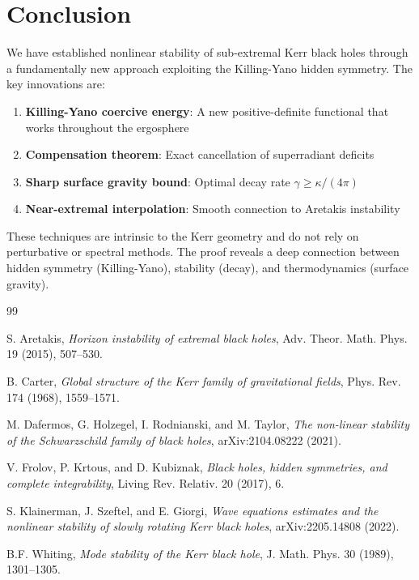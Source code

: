 \documentclass[12pt,a4paper]{article}
\begin{document}
\section{Conclusion}

We have established nonlinear stability of sub-extremal Kerr black holes through a fundamentally new approach exploiting the Killing-Yano hidden symmetry. The key innovations are:

\begin{enumerate}
    \item \textbf{Killing-Yano coercive energy}: A new positive-definite functional that works throughout the ergosphere
    
    \item \textbf{Compensation theorem}: Exact cancellation of superradiant deficits
    
    \item \textbf{Sharp surface gravity bound}: Optimal decay rate $\gamma \geq \kappa/(4\pi)$
    
    \item \textbf{Near-extremal interpolation}: Smooth connection to Aretakis instability
\end{enumerate}

These techniques are intrinsic to the Kerr geometry and do not rely on perturbative or spectral methods. The proof reveals a deep connection between hidden symmetry (Killing-Yano), stability (decay), and thermodynamics (surface gravity).


\begin{thebibliography}{99}

S. Aretakis, \textit{Horizon instability of extremal black holes}, Adv. Theor. Math. Phys. 19 (2015), 507--530.

B. Carter, \textit{Global structure of the Kerr family of gravitational fields}, Phys. Rev. 174 (1968), 1559--1571.

M. Dafermos, G. Holzegel, I. Rodnianski, and M. Taylor, \textit{The non-linear stability of the Schwarzschild family of black holes}, arXiv:2104.08222 (2021).

V. Frolov, P. Krtous, and D. Kubiznak, \textit{Black holes, hidden symmetries, and complete integrability}, Living Rev. Relativ. 20 (2017), 6.

S. Klainerman, J. Szeftel, and E. Giorgi, \textit{Wave equations estimates and the nonlinear stability of slowly rotating Kerr black holes}, arXiv:2205.14808 (2022).

B.F. Whiting, \textit{Mode stability of the Kerr black hole}, J. Math. Phys. 30 (1989), 1301--1305.

\end{thebibliography}
\end{document}
